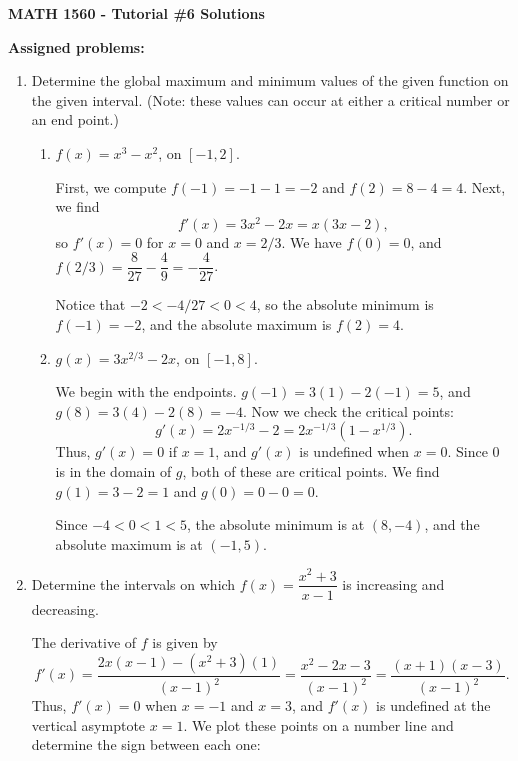 \documentclass[12pt]{article}
\begin{document}
\author{Instructor: Sean Fitzpatrick}
\thispagestyle{empty}
\begin{center}
{\bf MATH 1560 - Tutorial \#6 Solutions}
\end{center}

\textbf{Assigned problems:}
\begin{enumerate}
\item Determine the global maximum and minimum values of the given function on the given interval. (Note: these values can occur at either a critical number or an end point.)
\begin{enumerate}
\item $f(x)=x^3-x^2$, on $[-1,2]$.

First, we compute $f(-1)=-1-1=-2$ and $f(2)=8-4=4$. Next, we find
\[
f'(x) = 3x^2-2x=x(3x-2),
\]
so $f'(x)=0$ for $x=0$ and $x=2/3$. We have $f(0)=0$, and $f(2/3) = \dfrac{8}{27}-\dfrac{4}{9} = -\dfrac{4}{27}$.

Notice that $-2<-4/27<0<4$, so the absolute minimum is $f(-1)=-2$, and the absolute maximum is $f(2)=4$.

\item $g(x) = 3x^{2/3}-2x$, on $[-1,8]$.

We begin with the endpoints. $g(-1) = 3(1)-2(-1)=5$, and $g(8)=3(4)-2(8)=-4$. Now we check the critical points:
\[
g'(x) = 2x^{-1/3}-2=2x^{-1/3}(1-x^{1/3}).
\]
Thus, $g'(x)=0$ if $x=1$, and $g'(x)$ is undefined when $x=0$. Since 0 is in the domain of $g$, both of these are critical points. We find $g(1)=3-2=1$ and $g(0)=0-0=0$.

Since $-4<0<1<5$, the absolute minimum is at $(8,-4)$, and the absolute maximum is at $(-1,5)$.


\end{enumerate}

\item  Determine the intervals on which $f(x) = \dfrac{x^2+3}{x-1}$ is increasing and decreasing.

The derivative of $f$ is given by
\[
f'(x) = \frac{2x(x-1)-(x^2+3)(1)}{(x-1)^2} = \frac{x^2-2x-3}{(x-1)^2}=\frac{(x+1)(x-3)}{(x-1)^2}.
\]
Thus, $f'(x) = 0$ when $x=-1$ and $x=3$, and $f'(x)$ is undefined at the  vertical asymptote $x=1$. We plot these points on a number line and determine the sign between each one:

    \begin{center}
\end{center}


\end{enumerate}
\end{document}
